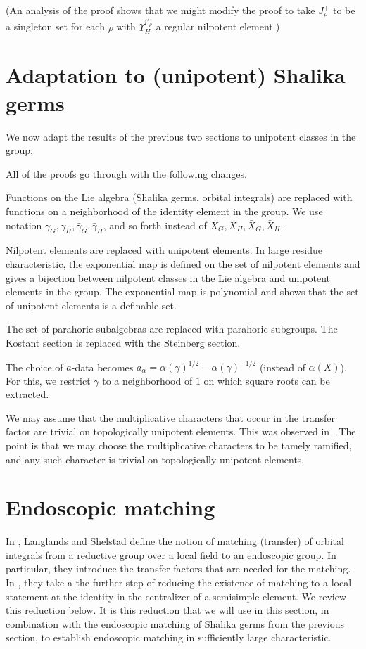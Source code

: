 \documentclass[12pt]{amsart}
\def\Y{\Upsilon}
\theoremstyle{plain}
\theoremstyle{definition}
\begin{document}
(An analysis of the proof shows that we might modify the proof to take
$J^+_\rho$ to be a singleton set for each $\rho$ with $\Y_H^{i'_\rho}$
a regular nilpotent element.)

\section{Adaptation to (unipotent) Shalika germs}

We now adapt the results of the previous two sections to unipotent
classes in the group.

All of the proofs go through with the following changes.

Functions on the Lie algebra (Shalika germs, orbital integrals) are
replaced with functions on a neighborhood of the identity element in
the group.  We use notation $\gamma_G,\gamma_H,\bar \gamma_G,\bar
\gamma_H$, and so forth instead of $X_G,X_H,\bar X_G,\bar X_H$.

Nilpotent elements are replaced with unipotent elements.  In large
residue characteristic,
the exponential map is defined on the set of nilpotent elements and
gives a bijection between nilpotent classes in the Lie algebra and
unipotent elements in the group.  The exponential map is polynomial
and shows that the set of unipotent elements is a definable set.

The set of parahoric subalgebras are replaced with parahoric subgroups.
The Kostant section is replaced with the Steinberg section.  

The
choice of $a$-data becomes $a_\alpha = \alpha(\gamma)^{1/2} -
\alpha(\gamma)^{-1/2}$ (instead of $\alpha(X)$).  For this, we
restrict $\gamma$ to a neighborhood of $1$ on which square roots can
be extracted.

We may assume that the multiplicative characters that occur in the
transfer factor are trivial on topologically unipotent elements.  This
was observed in \cite{hales-simple}.  The point is that we may choose
the multiplicative characters to be tamely ramified, and any such
character is trivial on topologically unipotent elements.

\section{Endoscopic matching}

In \cite{LSxf}, Langlands and Shelstad define the notion of matching
(transfer) of orbital integrals from a reductive group over a local
field to an endoscopic group.  In particular, they introduce the
transfer factors that are needed for the matching.  In \cite{LSd},
they take a the further step of reducing the existence of matching to
a local statement at the identity in the centralizer of a semisimple
element.  We review this reduction below.  It is this reduction that
we will use in this section, in combination with the endoscopic
matching of Shalika germs from the previous section, to establish
endoscopic matching in sufficiently large characteristic.
\end{document}
